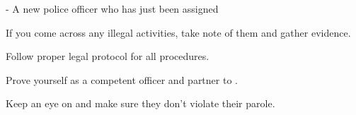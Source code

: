\documentclass[char]{guildcamp4}
\begin{document}
\name{\cCgood{}}

- A new police officer who has just been assigned 

\begin{itemz}[Goals]
	\item If you come across any illegal activities, take note of them and gather evidence.
	\item Follow proper legal protocol for all procedures.
	\item Prove yourself as a competent officer and partner to \cCbad{}.
	\item Keep an eye on \cProbie{} and make sure they don't violate their parole. 
\end{itemz}

\begin{itemz}[Notes]
	\item 
\end{itemz}

\begin{contacts}
	\contact{\cTest{}}
\end{contacts}
\end{document}
